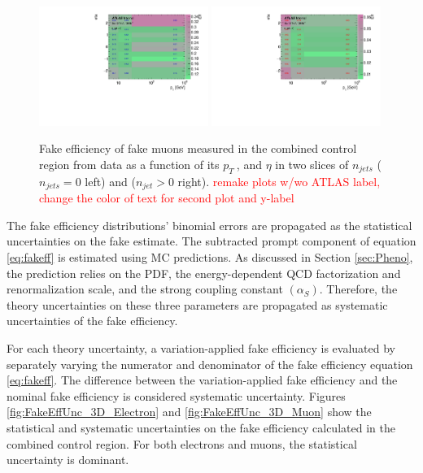 \begin{figure}[htb]
        \begin{center}
        \includegraphics[width = 0.49\textwidth]{figures/Analysis/Background/njet0_FakeEfficiency3D_mu_pt_eta.pdf}
        \includegraphics[width = 0.49\textwidth]{figures/Analysis/Background/njet1_FakeEfficiency3D_mu_pt_eta.pdf} 
        \end{center}
    \caption{Fake efficiency of fake muons measured in the combined control region from data as a function of its $p_{T}~$, and $\eta$ in two slices of $n_{jets}$ ($n_{jets}=0$ left) and ($n_{jet} > 0$ right). \textcolor{red}{remake plots w/wo ATLAS label, change the color of text for second plot and y-label} \label{fig:MuonFakeEff}}
\end{figure}

The fake efficiency distributions' binomial errors are propagated as the statistical uncertainties on the fake estimate. The subtracted prompt component of equation \ref{eq:fakeff} is estimated using MC predictions. As discussed in Section \ref{sec:Pheno}, the prediction relies on the PDF, the energy-dependent QCD factorization and renormalization scale, and the strong coupling constant $(\alpha_{S})$. Therefore, the theory uncertainties on these three parameters are propagated as systematic uncertainties of the fake efficiency. 

For each theory uncertainty, a variation-applied fake efficiency is evaluated by separately varying the numerator and denominator of the fake efficiency equation \ref{eq:fakeff}. The difference between the variation-applied fake efficiency and the nominal fake efficiency is considered systematic uncertainty. Figures \ref{fig:FakeEffUnc_3D_Electron} and \ref{fig:FakeEffUnc_3D_Muon} show the statistical and systematic uncertainties on the fake efficiency calculated in the combined control region. For both electrons and muons, the statistical uncertainty is dominant.

